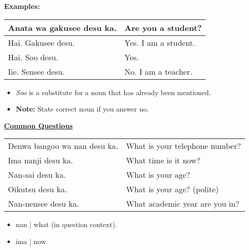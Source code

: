 \documentclass{article}
\begin{document}
\begin{tcolorbox}[colback=blue!10!white]
{\bf Examples:}

\begin{tabular}{ l | l }
Anata wa gakusee desu ka. & Are you a student?\\
\hline
\hline
Hai. Gakusee desu. & Yes. I am a student.\\
Hai. Soo desu. & Yes.\\
Iie. Sensee desu. & No. I am a teacher.\\
\end{tabular}

\begin{itemize}
\item {\it Soo} is a substitute for a noun that has already been mentioned.
\item {\bf Note:} State correct noun if you answer no.
\end{itemize}
\end{tcolorbox}

\begin{tcolorbox}[colback=yellow!40!white]
\underline{\bf Common Questions}

\begin{tabular}{ l | l }
Denwa bangoo wa nan desu ka. & What is your telephone number?\\
Ima nanji desu ka. & What time is it now?\\
Nan-sai desu ka. & What is your age?\\
Oikutsu desu ka. & What is your age? (polite)\\
Nan-nensee desu ka. & What academic year are you in?\\
\end{tabular}

\begin{itemize}
\item nan | what (in question context).
\item ima | now.
\end{itemize}
\end{tcolorbox}
\end{document}
